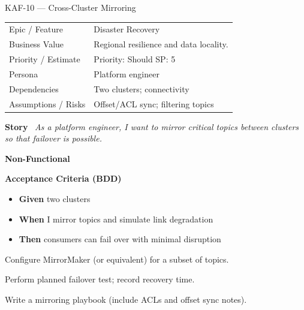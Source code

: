 \documentclass[11pt,a4paper]{article}
\newcommand{\Field}[2]{\textbf{#1}~#2}
\begin{document}
\begin{StoryCardBox}{KAF-10 --- Cross-Cluster Mirroring}
\begin{tabularx}{\linewidth}{LY}
 Epic / Feature & Disaster Recovery \\
 Business Value & Regional resilience and data locality. \\
 Priority / Estimate & Priority: Should \quad SP: 5 \\
 Persona & Platform engineer \\
 Dependencies & Two clusters; connectivity \\
 Assumptions / Risks & Offset/ACL sync; filtering topics \\
\end{tabularx}

\medskip
\Field{Story}{\; \emph{As a platform engineer, I want to mirror critical topics between clusters so that failover is possible.}}

\medskip
\Field{Non-Functional}{\; \; }

\medskip
\Field{Acceptance Criteria (BDD)}{}
\begin{itemize}[leftmargin=1.2em, itemsep=1pt]
  \item \textbf{Given} two clusters
  \item \textbf{When} I mirror topics and simulate link degradation
  \item \textbf{Then} consumers can fail over with minimal disruption
\end{itemize}

\begin{TasksBox}
\begin{tasklist}
  \item Configure MirrorMaker (or equivalent) for a subset of topics.
  \item Perform planned failover test; record recovery time.
  \item Write a mirroring playbook (include ACLs and offset sync notes).
\end{tasklist}
\end{TasksBox}
\end{StoryCardBox}
\clearpage
\end{document}
